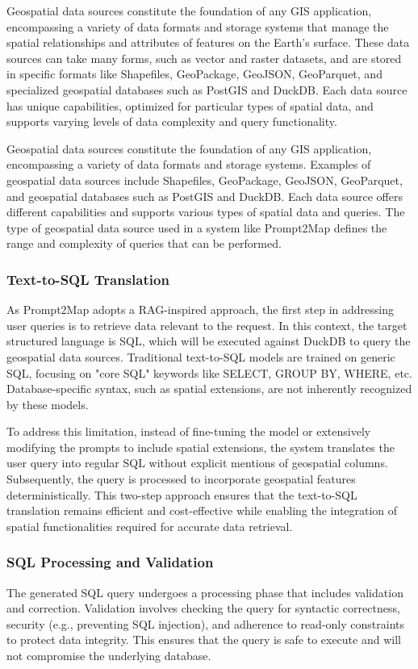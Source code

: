 Geospatial data sources constitute the foundation of any GIS application, encompassing a variety of data formats and storage systems that manage the spatial relationships and attributes of features on the Earth's surface. These data sources can take many forms, such as vector and raster datasets, and are stored in specific formats like Shapefiles, GeoPackage, GeoJSON, GeoParquet, and specialized geospatial databases such as PostGIS and DuckDB. Each data source has unique capabilities, optimized for particular types of spatial data, and supports varying levels of data complexity and query functionality.

Geospatial data sources constitute the foundation of any GIS application, encompassing a variety of data formats and storage systems. Examples of geospatial data sources include Shapefiles, GeoPackage, GeoJSON, GeoParquet, and geospatial databases such as PostGIS and DuckDB. Each data source offers different capabilities and supports various types of spatial data and queries. The type of geospatial data source used in a system like Prompt2Map defines the range and complexity of queries that can be performed.

\subsubsection{Text-to-SQL Translation}

As Prompt2Map adopts a RAG-inspired approach, the first step in addressing user queries is to retrieve data relevant to the request. In this context, the target structured language is SQL, which will be executed against DuckDB to query the geospatial data sources. Traditional text-to-SQL models are trained on generic SQL, focusing on "core SQL" keywords like SELECT, GROUP BY, WHERE, etc. Database-specific syntax, such as spatial extensions, are not inherently recognized by these models.

To address this limitation, instead of fine-tuning the model or extensively modifying the prompts to include spatial extensions, the system translates the user query into regular SQL without explicit mentions of geospatial columns. Subsequently, the query is processed to incorporate geospatial features deterministically. This two-step approach ensures that the text-to-SQL translation remains efficient and cost-effective while enabling the integration of spatial functionalities required for accurate data retrieval.

\subsubsection{SQL Processing and Validation}
The generated SQL query undergoes a processing phase that includes validation and correction. Validation involves checking the query for syntactic correctness, security (e.g., preventing SQL injection), and adherence to read-only constraints to protect data integrity. This ensures that the query is safe to execute and will not compromise the underlying database.


